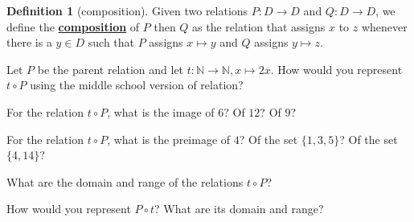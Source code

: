 \documentclass[11pt]{article}
\newenvironment{task}
	{\begin{mdframed}[linecolor=lightgray, linewidth=3pt]\raggedright}
	{\end{mdframed}}
\newcommand{\N}{\mathbb{N}}
\renewcommand\emph[1]{\underline{\bf{#1}}} %
\theoremstyle{definition}
\newtheorem{definition}[theorem]{Definition}
\begin{document}
\begin{definition}[composition]\label{d: relation composition}
Given two relations $P:D\to D$ and $Q:D\to D$, we define the \emph{composition} of $P$ then $Q$ 
as the relation that assigns $x$ to $z$ whenever there is a $y\in D$ such that $P$ assigns $x\mapsto y$ and $Q$ assigns $y\mapsto z$.
\end{definition}

\vspace*{-8pt}
\begin{task}
Let $P$ be the parent relation and let $t:\N\to \N, x\mapsto 2x$. How would you represent $t\circ P$ using the middle school version of relation? 
\end{task}

\begin{task}
For the relation $t\circ P$, what is the image of $6$? Of $12$? Of $9$?

For the relation $t\circ P$, what is the preimage of $4$? Of the set $\{1, 3, 5\}$? Of the set $\{4,14\}$?

What are the domain and range of the relations $t\circ P$?

How would you represent $P\circ t$? What are its domain and range?
\end{task}
\end{document}
